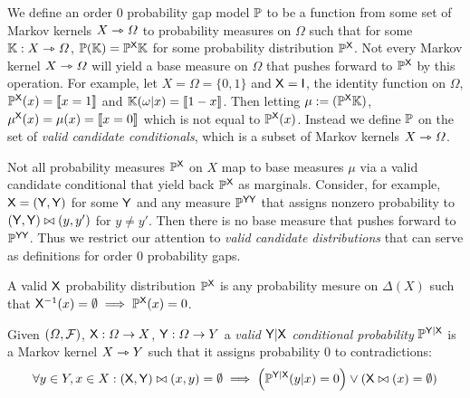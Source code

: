 We define an order 0 probability gap model $\mathbb{P}$ to be a function from some set of Markov kernels $X\rightarrowtriangle \Omega$ to probability measures on $\Omega$ such that for some $\mathbb{K}:X\rightarrowtriangle \Omega$, $\mathbb{P}(\mathbb{K})=\mathbb{P}^{\mathsf{X}}\mathbb{K}$ for some probability distribution $\mathbb{P}^{\mathsf{X}}$. Not every Markov kernel $X\rightarrowtriangle \Omega$ will yield a base measure on $\Omega$ that pushes forward to $\mathbb{P}^{\mathsf{X}}$ by this operation. For example, let $X=\Omega=\{0,1\}$ and $\mathsf{X}=\mathsf{I}$, the identity function on $\Omega$, $\mathbb{P}^{\mathsf{X}}(x)=\llbracket x=1 \rrbracket$ and $\mathbb{K}(\omega|x) = \llbracket 1 - x \rrbracket$. Then letting $\mu:=(\mathbb{P}^{\mathsf{X}} \mathbb{K})$, $\mu^{\mathsf{X}}(x)=\mu(x)=\llbracket x=0 \rrbracket$ which is not equal to $\mathbb{P}^{\mathsf{X}}(x)$. Instead we define $\mathbb{P}$ on the set of \emph{valid candidate conditionals}, which is a subset of Markov kernels $X\rightarrowtriangle \Omega$.

Not all probability measures $\mathbb{P}^{\mathsf{X}}$ on $X$ map to base measures $\mu$ via a valid candidate conditional that yield back $\mathbb{P}^{\mathsf{X}}$ as marginals. Consider, for example, $\mathsf{X}=(\mathsf{Y},\mathsf{Y})$ for some $\mathsf{Y}$ and any measure $\mathbb{P}^{\mathsf{YY}}$ that assigns nonzero probability to $(\mathsf{Y},\mathsf{Y})\bowtie (y,y')$ for $y\neq y'$. Then there is no base measure that pushes forward to $\mathbb{P}^{\mathsf{YY}}$. Thus we restrict our attention to \emph{valid candidate distributions} that can serve as definitions for order 0 probability gaps.

\begin{definition}\label{def:valid_dist}
A valid $\mathsf{X}$ probability distribution $\mathbb{P}^{\mathsf{X}}$ is any probability mesure on $\Delta(X)$ such that $\mathsf{X}^{-1}(x)=\emptyset\implies \mathbb{P}^{\mathsf{X}}(x) = 0$.
\end{definition}

\begin{definition}\label{def:valid_conditional_prob}
Given $(\Omega,\mathcal{F})$, $\mathsf{X}:\Omega\to X$, $\mathsf{Y}:\Omega\to Y$ a \emph{valid $\mathsf{Y}|\mathsf{X}$ conditional probability} $\mathbb{P}^{\mathsf{Y}|\mathsf{X}}$ is a Markov kernel $X\rightarrowtriangle Y$ such that it assigns probability 0 to contradictions:
\begin{align}
	\forall y\in Y, x\in X: (\mathsf{X},\mathsf{Y})\bowtie(x,y) = \emptyset \implies \left(\mathbb{P}^{\mathsf{Y}|\mathsf{X}}(y|x) = 0\right) \lor \left(\mathsf{X}\bowtie (x) = \emptyset\right)
\end{align}
\end{definition}

